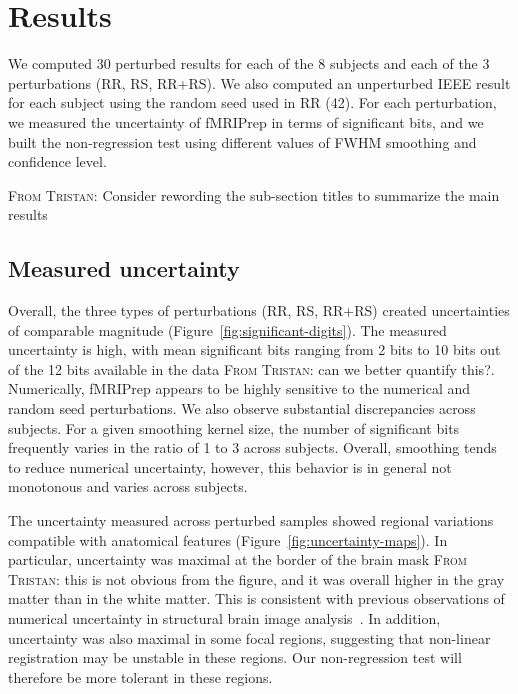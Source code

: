 \documentclass{article}
\newcommand{\TG}[1]{\color{blue}\textsc{From Tristan:} #1\color{black}\xspace}
\newcommand{\fmriprep}{fMRIPrep\xspace}
\begin{document}
\section{Results}

We computed 30 perturbed results for each of the 8 subjects and each of the 3 perturbations (RR, RS, RR+RS). We also computed an unperturbed IEEE result for each subject using the 
random seed used in RR (42). For each perturbation, we measured the uncertainty of fMRIPrep in terms of significant bits, and we built the non-regression test using different values of FWHM smoothing and confidence level.

\TG{Consider rewording the sub-section titles to summarize the main results}

\subsection{Measured uncertainty}

Overall, the three types of perturbations (RR, RS, RR+RS) created uncertainties of comparable magnitude (Figure~\ref{fig:significant-digits}). The measured uncertainty is high, with mean significant bits ranging from 2 bits to 10 bits out of the 12 bits available in the data \TG{can we better quantify this?}. Numerically, \fmriprep appears to be highly sensitive to the numerical and random seed perturbations. We also observe substantial discrepancies across subjects. For a given smoothing kernel size, the number of significant bits frequently varies in the ratio of 1 to 3 across subjects. Overall, smoothing tends to reduce numerical uncertainty, however, this behavior is in general not monotonous and varies across subjects.

The uncertainty measured across perturbed samples showed regional variations compatible with anatomical features (Figure~\ref{fig:uncertainty-maps}). In particular, uncertainty was 
maximal at the border of the brain mask \TG{this is not obvious from the figure}, and it was overall higher in the gray matter than in the white matter. 
This is consistent with previous observations of numerical uncertainty in structural brain image analysis~\cite{salari2021accurate}.
 In addition, uncertainty was also maximal in some focal regions, suggesting that non-linear registration may be unstable in these regions. Our non-regression test will therefore be more tolerant in these regions.
\end{document}
